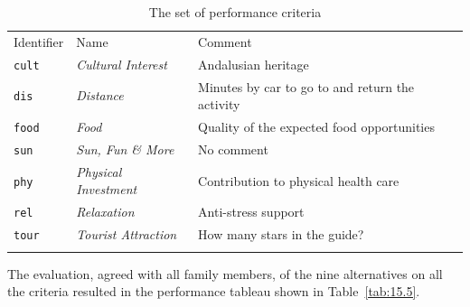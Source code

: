 \begin{table}[ht]
\caption{The set of performance criteria}
\label{tab:15.4}       %
\begin{center}
\begin{small}
    \begin{tabular}{l l l}
      \svhline\noalign{\smallskip}
      Identifier & Name & Comment \\
      \noalign{\smallskip}\hline\noalign{\smallskip}
      \texttt{cult}   & \emph{Cultural Interest}  & Andalusian heritage\\
      \texttt{dis}  & \emph{Distance}  & Minutes by car to go to and return the activity\\
      \texttt{food}  & \emph{Food}  &  Quality of the expected food opportunities\\
      \texttt{sun} & \emph{Sun, Fun \& More}  &  No comment\\
      \texttt{phy}   & \emph{Physical Investment}  &  Contribution to physical health care\\
      \texttt{rel}  & \emph{Relaxation}   &  Anti-stress support\\
      \texttt{tour}  & \emph{Tourist Attraction}   &  How many stars in the guide? \\
      \noalign{\smallskip}\hline
    \end{tabular}
\end{small}
\end{center}
\end{table}

The evaluation, agreed with all family members, of the nine alternatives on all the criteria resulted in the performance tableau shown in Table~\vref{tab:15.5}.

